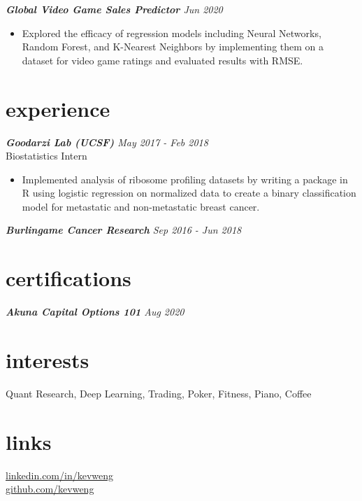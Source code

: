 \documentclass[margin, 12pt]{res} %
\begin{document}
\begin{resume}
{\sl {\bf Global Video Game Sales Predictor} \hfill Jun 2020}
\begin{itemize}  \itemsep -1pt
\item Explored the efficacy of regression models including Neural Networks, Random Forest, and K-Nearest Neighbors by implementing them on a dataset for video game ratings and evaluated results with RMSE.
\end{itemize} 


\section{\large experience}

{\sl {\bf {Goodarzi Lab (UCSF)}} \hfill May 2017 - Feb 2018} \\
Biostatistics Intern
\begin{itemize} \itemsep -1pt %
\item Implemented analysis of ribosome profiling datasets by writing a package in R using logistic regression on normalized data to create a binary classification model for metastatic and non-metastatic breast cancer.
\end{itemize}
 
{\sl {\bf Burlingame Cancer Research} \hfill Sep 2016 - Jun 2018}


\section{\large certifications}
{\sl {\bf Akuna Capital Options 101} \hfill Aug 2020}

\section{\large interests}
Quant Research, Deep Learning, Trading, Poker, Fitness, Piano, Coffee

\section{\large links}

\href{https://www.linkedin.com/in/kevweng/}{linkedin.com/in/kevweng}\\
\href{https://github.com/kevweng}{github.com/kevweng}\\
\end{resume}
\end{document}

